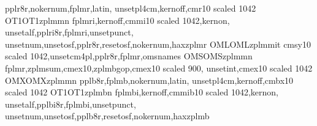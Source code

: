 %
%

%
%
\endrecordtransforms
\endrecordtransforms
%
\installfonts
	{pplr8r,nokernum,fplmr,latin,
	unsetpl4cm,kernoff,cmr10 scaled 1042}
	{OT1}{OT1}{zplm}{m}{n}{}
	{fplmri,kernoff,cmmi10 scaled 1042,kernon,
	unsetalf,pplri8r,fplmri,unsetpunct,
	unsetnum,unsetosf,pplr8r,resetosf,nokernum,haxzplmr}
	{OML}{OML}{zplm}{m}{it}{}
	{cmsy10 scaled 1042,unsetcm4pl,pplr8r,fplmr,omsnames}
	{OMS}{OMS}{zplm}{m}{n}{}
	{fplmr,zplmsum,cmex10,zplmbgop,cmex10 scaled 900,
	unsetint,cmex10 scaled 1042}
	{OMX}{OMX}{zplm}{m}{n}{}
	{pplb8r,fplmb,nokernum,latin,
	unsetpl4cm,kernoff,cmbx10 scaled 1042}
	{OT1}{OT1}{zplm}{b}{n}{}
	{fplmbi,kernoff,cmmib10 scaled 1042,kernon,
	unsetalf,pplbi8r,fplmbi,unsetpunct,
	unsetnum,unsetosf,pplb8r,resetosf,nokernum,haxzplmb}
